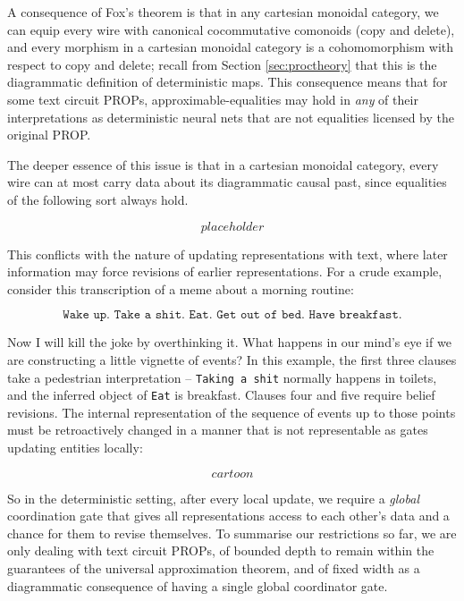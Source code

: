 A consequence of Fox's theorem is that in any cartesian monoidal category, we can equip every wire with canonical cocommutative comonoids (copy and delete), and every morphism in a cartesian monoidal category is a cohomomorphism with respect to copy and delete; recall from Section \ref{sec:proctheory} that this is the diagrammatic definition of deterministic maps. This consequence means that for some text circuit PROPs, approximable-equalities may hold in \emph{any} of their interpretations as deterministic neural nets that are not equalities licensed by the original PROP.

\begin{example}

\end{example}

The deeper essence of this issue is that in a cartesian monoidal category, every wire can at most carry data about its diagrammatic causal past, since equalities of the following sort always hold.

\[placeholder\]

This conflicts with the nature of updating representations with text, where later information may force revisions of earlier representations. For a crude example, consider this transcription of a meme about a morning routine:

\[\texttt{Wake up. Take a shit. Eat. Get out of bed. Have breakfast.}\]

Now I will kill the joke by overthinking it. What happens in our mind's eye if we are constructing a little vignette of events? In this example, the first three clauses take a pedestrian interpretation -- \texttt{Taking a shit} normally happens in toilets, and the inferred object of \texttt{Eat} is breakfast. Clauses four and five require belief revisions. The internal representation of the sequence of events up to those points must be retroactively changed in a manner that is not representable as gates updating entities locally:

\[cartoon\]

So in the deterministic setting, after every local update, we require a \emph{global} coordination gate that gives all representations access to each other's data and a chance for them to revise themselves. To summarise our restrictions so far, we are only dealing with text circuit PROPs, of bounded depth to remain within the guarantees of the universal approximation theorem, and of fixed width as a diagrammatic consequence of having a single global coordinator gate.

